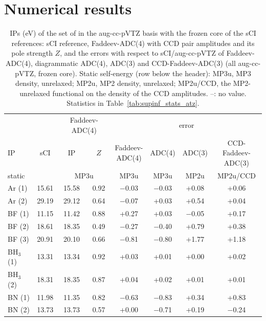 \documentclass[aip,jcp,reprint,noshowkeys,superscriptaddress]{revtex4-1}
\begin{document}
\section{\label{sec:numerics}Numerical results}





\begin{table}[hbt!]
\centering
\caption{\label{tab:supinf_atz_adc4}IPs (eV) of the set of \citet{Marie2024a} in the aug-cc-pVTZ basis with the frozen core of the sCI references: sCI reference, Faddeev-ADC(4) with CCD pair amplitudes and its pole strength $Z$, and the errors with respect to sCI/aug-cc-pVTZ of Faddeev-ADC(4), diagrammatic ADC(4), ADC(3) and CCD-Faddeev-ADC(3) (all aug-cc-pVTZ, frozen core). Static self-energy (row below the header): MP3u, MP3 density, unrelaxed; MP2u, MP2 density, unrelaxed; MP2u/CCD, the MP2-unrelaxed functional on the density of the CCD amplitudes. --: no value. Statistics in Table~\ref{tab:supinf_stats_atz}.}
\scriptsize
\begin{tabular}{lccccccc}
\toprule
 & & \multicolumn{2}{c}{Faddeev-ADC(4)} & \multicolumn{4}{c}{error} \\
\cmidrule(lr){3-4} \cmidrule(lr){5-8}
 IP & sCI & IP & $Z$ & \makecell{Faddeev-\\ADC(4)} & ADC(4) & ADC(3) & \makecell{CCD-Faddeev-\\ADC(3)} \\
\midrule
static & & \multicolumn{2}{c}{MP3u} & MP3u & MP3u & MP2u & MP2u/CCD \\
\midrule
Ar (1) & 15.61 & 15.58 & 0.92 & $-$0.03 & $-$0.03 & +0.08 & +0.06 \\
Ar (2) & 29.19 & 29.12 & 0.64 & $-$0.07 & +0.03 & +0.54 & +0.04 \\
BF (1) & 11.15 & 11.42 & 0.88 & +0.27 & +0.03 & $-$0.05 & +0.17 \\
BF (2) & 18.61 & 18.35 & 0.49 & $-$0.27 & $-$0.40 & +0.79 & +0.38 \\
BF (3) & 20.91 & 20.10 & 0.66 & $-$0.81 & $-$0.80 & +1.77 & +1.18 \\
BH$_3$ (1) & 13.31 & 13.34 & 0.92 & +0.03 & +0.01 & +0.00 & +0.02 \\
BH$_3$ (2) & 18.31 & 18.35 & 0.87 & +0.04 & +0.02 & +0.01 & +0.01 \\
BN (1) & 11.98 & 11.35 & 0.82 & $-$0.63 & $-$0.83 & +0.34 & +0.83 \\
BN (2) & 13.73 & 13.73 & 0.57 & +0.00 & $-$0.71 & +0.19 & $-$0.24 \\

\end{tabular}
\end{table}
\end{document}
